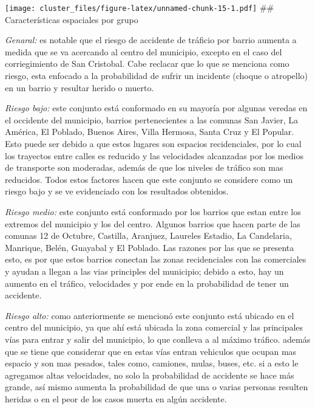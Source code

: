 \documentclass[
]{article}
\begin{document}
\texttt{[image: cluster\_files/figure-latex/unnamed-chunk-15-1.pdf]} \#\#
Características espaciales por grupo

\emph{Genaral:} es notable que el riesgo de accidente de tráficio por
barrio aumenta a medida que se va acercando al centro del municipio,
excepto en el caso del corriegimiento de San Cristobal. Cabe reclacar
que lo que se menciona como riesgo, esta enfocado a la probabilidad de
sufrir un incidente (choque o atropello) en un barrio y resultar herido
o muerto.

\emph{Riesgo bajo:} este conjunto está conformado en su mayoría por
algunas veredas en el occidente del municipio, barrios pertenecientes a
las comunas San Javier, La América, El Poblado, Buenos Aires, Villa
Hermosa, Santa Cruz y El Popular. Esto puede ser debido a que estos
lugares son espacios recidenciales, por lo cual los trayectos entre
calles es reducido y las velocidades alcanzadas por los medios de
transporte son moderadas, además de que los niveles de tráfico son mas
reducidos. Todos estos factores hacen que este conjunto se considere
como un riesgo bajo y se ve evidenciado con los resultados obtenidos.

\emph{Riesgo medio:} este conjunto está conformado por los barrios que
estan entre los extremos del municipio y los del centro. Algunos barrios
que hacen parte de las comunas 12 de Octubre, Castilla, Aranjuez,
Laureles Estadio, La Candelaria, Manrique, Belén, Guayabal y El Poblado.
Las razones por las que se presenta esto, es por que estos barrios
conectan las zonas recidenciales con las comerciales y ayudan a llegan a
las vias principles del municipio; debido a esto, hay un aumento en el
tráfico, velocidades y por ende en la probabilidad de tener un
accidente.

\emph{Riesgo alto:} como anteriormente se mencionó este conjunto está
ubicado en el centro del municipio, ya que ahí está ubicada la zona
comercial y las principales vías para entrar y salir del municipio, lo
que conlleva a al máximo tráfico. además que se tiene que considerar que
en estas vías entran vehiculos que ocupan mas espacio y son mas pesados,
tales como, camiones, mulas, buses, etc. si a esto le agregamos altas
velocidades, no solo la probabilidad de accidente se hace más grande,
así mismo aumenta la probabilidad de que una o varias personas resulten
heridas o en el peor de los casos muerta en algún accidente.
\end{document}
